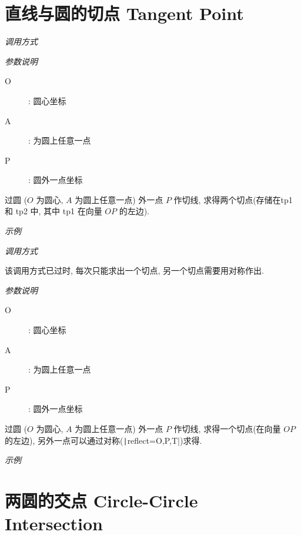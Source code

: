 
\section{直线与圆的切点 Tangent Point}

\emph{调用方式}

\begin{tcolorbox}{}
\end{tcolorbox}

\emph{参数说明}

\begin{description}
  \item[O]: 圆心坐标
  \item[A]: 为圆上任意一点
  \item[P]: 圆外一点坐标
\end{description}

过圆 ($O$ 为圆心, $A$ 为圆上任意一点) 外一点 $P$ 作切线, 
求得两个切点(存储在tp1 和 tp2 中, 其中 tp1 在向量 $OP$ 的左边).

\emph{示例}


\emph{调用方式}

\begin{tcolorbox}{}
\end{tcolorbox}

\begin{remark*}
  该调用方式已过时, 每次只能求出一个切点, 另一个切点需要用对称作出.
\end{remark*}

\emph{参数说明}

\begin{description}
  \item[O]: 圆心坐标
  \item[A]: 为圆上任意一点
  \item[P]: 圆外一点坐标
\end{description}

过圆 ($O$ 为圆心, $A$ 为圆上任意一点) 外一点 $P$ 作切线, 求得一个切点(在向量 $OP$ 的左边),
另外一点可以通过对称(\texttt|reflect={O,P,T}|)求得.

\emph{示例}


\section{两圆的交点 Circle-Circle Intersection}

